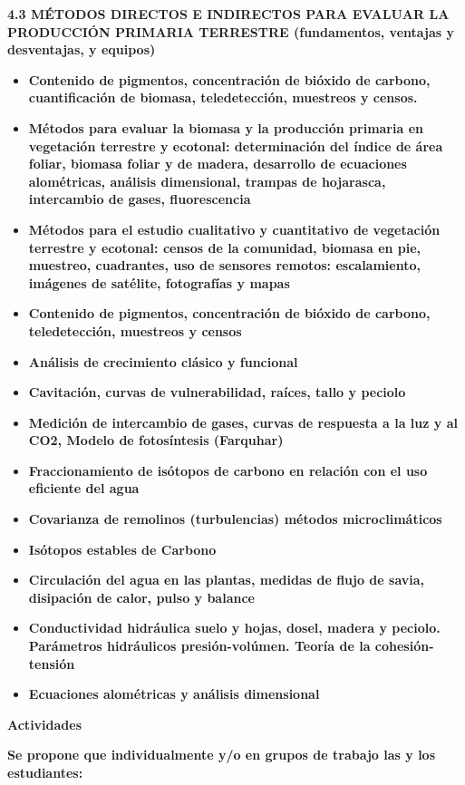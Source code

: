 \documentclass[
]{article}
\begin{document}
\textbf{4.3 MÉTODOS DIRECTOS E INDIRECTOS PARA EVALUAR LA PRODUCCIÓN
PRIMARIA TERRESTRE (fundamentos, ventajas y desventajas, y equipos)}

\begin{itemize}
\item
  \textbf{Contenido de pigmentos, concentración de bióxido de carbono,
  cuantificación de biomasa, teledetección, muestreos y censos.}
\item
  \textbf{Métodos para evaluar la biomasa y la producción primaria en
  vegetación terrestre y ecotonal: determinación del índice de área
  foliar, biomasa foliar y de madera, desarrollo de ecuaciones
  alométricas, análisis dimensional, trampas de hojarasca, intercambio
  de gases, fluorescencia}
\item
  \textbf{Métodos para el estudio cualitativo y cuantitativo de
  vegetación terrestre y ecotonal: censos de la comunidad, biomasa en
  pie, muestreo, cuadrantes, uso de sensores remotos: escalamiento,
  imágenes de satélite, fotografías y mapas}
\item
  \textbf{Contenido de pigmentos, concentración de bióxido de carbono,
  teledetección, muestreos y censos}
\item
  \textbf{Análisis de crecimiento clásico y funcional}
\item
  \textbf{Cavitación, curvas de vulnerabilidad, raíces, tallo y peciolo}
\item
  \textbf{Medición de intercambio de gases, curvas de respuesta a la luz
  y al CO2, Modelo de fotosíntesis (Farquhar)}
\item
  \textbf{Fraccionamiento de isótopos de carbono en relación con el uso
  eficiente del agua}
\item
  \textbf{Covarianza de remolinos (turbulencias) métodos
  microclimáticos}
\item
  \textbf{Isótopos estables de Carbono}
\item
  \textbf{Circulación del agua en las plantas, medidas de flujo de
  savia, disipación de calor, pulso y balance}
\item
  \textbf{Conductividad hidráulica suelo y hojas, dosel, madera y
  peciolo. Parámetros hidráulicos presión-volúmen. Teoría de la
  cohesión-tensión}
\item
  \textbf{Ecuaciones alométricas y análisis dimensional}
\end{itemize}

\textbf{Actividades}

\textbf{Se propone que individualmente y/o en grupos de trabajo las y
los estudiantes:}
\end{document}
